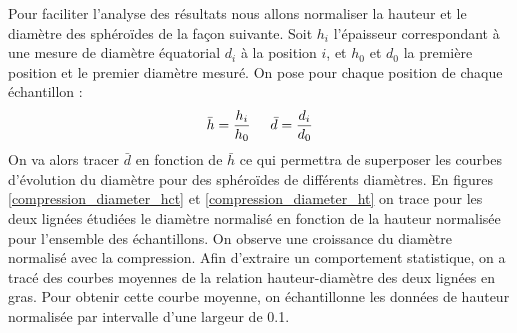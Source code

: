 Pour faciliter l'analyse des résultats nous allons normaliser la hauteur et le diamètre des sphéroïdes de la façon suivante. Soit $h_i$  l'épaisseur correspondant à une mesure de diamètre équatorial $d_i$  à la position $i$, et $h_0$ et $d_0$ la première position et le premier diamètre mesuré. On pose pour chaque position de chaque échantillon :
\begin{align} 
\bar{h} = \frac{h_i}{h_0} \hspace{0.5cm}  \bar{d} = \frac{d_i}{d_0}
\end{align}
On va alors tracer $\bar{d}$ en fonction de $\bar{h}$ ce qui permettra de superposer les courbes d'évolution du diamètre pour des sphéroïdes de différents diamètres. En figures \ref{compression_diameter_hct} et \ref{compression_diameter_ht} on trace pour les deux lignées étudiées le diamètre normalisé en fonction de la hauteur normalisée pour l'ensemble des échantillons. On observe une  croissance du diamètre normalisé avec la compression. Afin d'extraire un comportement statistique, on a tracé des courbes moyennes de la relation hauteur-diamètre des deux lignées en gras. Pour obtenir cette courbe moyenne, on échantillonne les données de hauteur normalisée par intervalle d'une largeur de 0.1. 
 
